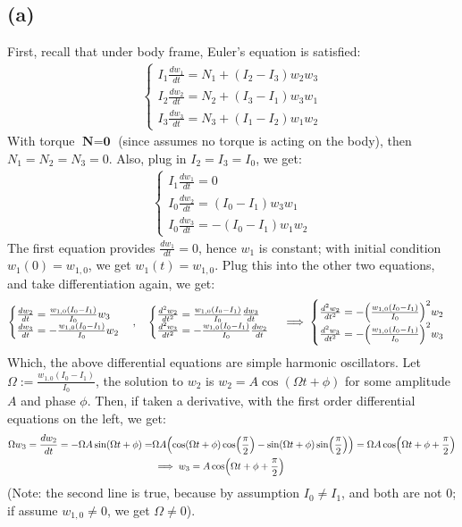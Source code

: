 \documentclass{article}
\DeclarePairedDelimiter{\paran}{(}{)}%
\newcommand{\bN}{\textbf{N}} %
\newcommand{\bzero}{\textbf{0}}
\begin{document}
\subsection*{(a)}
First, recall that under body frame, Euler's equation is satisfied:
\begin{align}
    \begin{cases}
        I_1\frac{dw_1}{dt}=N_1+(I_2-I_3)w_2w_3\\
        I_2\frac{dw_2}{dt}=N_2+(I_3-I_1)w_3w_1\\
        I_3\frac{dw_3}{dt}=N_3+(I_1-I_2)w_1w_2
    \end{cases}
\end{align}
With torque $\bN=\bzero$ (since assumes no torque is acting on the body), then $N_1=N_2=N_3=0$. Also, plug in $I_2=I_3 = I_0$, we get:
\begin{align}
    \begin{cases}
        I_1\frac{dw_1}{dt}=0\\
        I_0\frac{dw_2}{dt}=(I_0-I_1)w_3w_1\\
        I_0\frac{dw_3}{dt}=-(I_0-I_1)w_1w_2
    \end{cases}
\end{align}
The first equation provides $\frac{dw_1}{dt}=0$, hence $w_1$ is constant; with initial condition $w_1(0)=w_{1,0}$, we get $w_1(t) = w_{1,0}$. Plug this into the other two equations, and take differentiation again, we get:
\begin{align}
    \begin{cases}
        \frac{dw_2}{dt}=\frac{w_{1,0}(I_0-I_1)}{I_0}w_3\\
        \frac{dw_3}{dt}=-\frac{w_{1,0}(I_0-I_1)}{I_0}w_2
    \end{cases}, \quad \begin{cases}
        \frac{d^2w_2}{dt^2} = \frac{w_{1,0}(I_0-I_1)}{I_0}\frac{dw_3}{dt}\\
        \frac{d^2w_3}{dt^2}=-\frac{w_{1,0}(I_0-I_1)}{I_0}\frac{dw_2}{dt}
    \end{cases}\implies \begin{cases}
        \frac{d^2w_2}{dt^2} = -\paran*{\frac{w_{1,0}(I_0-I_1)}{I_0}}^2w_2\\
        \frac{d^2w_3}{dt^2}=-\paran*{\frac{w_{1,0}(I_0-I_1)}{I_0}}^2w_3
    \end{cases}
\end{align}
Which, the above differential equations are simple harmonic oscillators. Let $\Omega := \frac{w_{1,0}(I_0-I_1)}{I_0}$, the solution to $w_2$ is $w_2=A\cos(\Omega t+\phi)$ for some amplitude $A$ and phase $\phi$. Then, if taken a derivative, with the first order differential equations on the left, we get:
\begin{align}
    \Omega w_3 = \frac{dw_2}{dt} = -\Omega A\sin(\Omega t+\phi) = &\Omega A\paran*{\cos(\Omega t+\phi)\cos\paran*{\frac{\pi}{2}}-\sin(\Omega t+\phi)\sin\paran*{\frac{\pi}{2}}} = \Omega A\cos\paran*{\Omega t+\phi + \frac{\pi}{2}}\\
    &\implies w_3 = A\cos\paran*{\Omega t+\phi + \frac{\pi}{2}}
\end{align}
(Note: the second line is true, because by assumption $I_0\neq I_1$, and both are not $0$; if assume $w_{1,0}\neq 0$, we get $\Omega\neq 0$).
\end{document}
